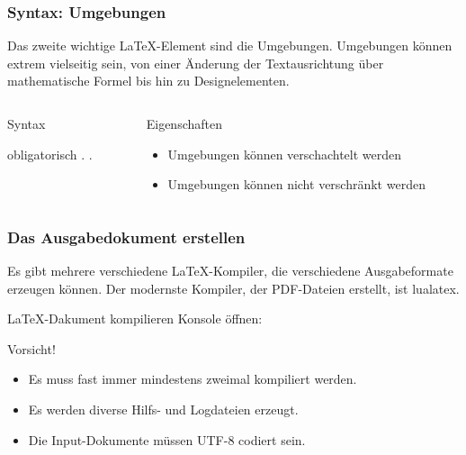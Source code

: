 \begin{frame}[fragile]
    \frametitle{Syntax: Umgebungen}
    Das zweite wichtige \LaTeX-Element sind die Umgebungen. Umgebungen können extrem vielseitig sein,
    von einer Änderung der Textausrichtung über mathematische Formel bis hin zu Designelementen.
    \begin{columns}[T]
        \begin{column}{0.47\textwidth}
            \begin{block}{Syntax}
                \begin{lstverbatim}
                \begin{Umgebung}[optional]
                                {obligatorisch}
                    .
                    .
                \end{Umgebung}
                \end{lstverbatim}
                \vspace{0.4cm}
            \end{block}
        \end{column}
        \begin{column}{0.47\textwidth}
            \begin{block}{Eigenschaften}
                \begin{itemize}
                    \item Umgebungen können verschachtelt werden
                    \item Umgebungen können \alert{nicht} verschränkt werden
                \end{itemize}
            \end{block}
        \end{column}
    \end{columns}
\end{frame}

\begin{frame}[fragile]
    \frametitle{Das Ausgabedokument erstellen}
    Es gibt mehrere verschiedene \LaTeX-Kompiler, die verschiedene Ausgabeformate erzeugen können.
    Der modernste Kompiler, der PDF-Dateien erstellt, ist \alert{lualatex}.

    \begin{block}{\LaTeX-Dakument kompilieren}
        Konsole öffnen:
    \end{block}
    \begin{alertblock}{Vorsicht!}
        \begin{itemize}
        \item Es muss fast immer mindestens zweimal kompiliert werden.
        \item Es werden diverse Hilfs- und Logdateien erzeugt.
        \item Die Input-Dokumente müssen UTF-8 codiert sein.
        \end{itemize}
    \end{alertblock}
\end{frame}
